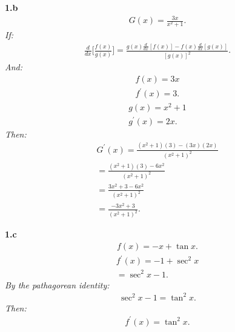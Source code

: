 \documentclass{report}
\begin{document}
    \pagebreak \bigbreak \noindent
    \begin{mdframed}
        \textbf{1.b}
        \begin{align*}
            G(x) = \frac{3x}{x^{2}+1}
        .\end{align*}
        \bigbreak \noindent 
        \bigbreak \noindent 
        \textit{If:}
        \begin{align*}
            \frac{d}{dx}\bigg[ \frac{f(x)}{g(x)}\bigg] = \frac{g(x) \frac{d}{dx}[f(x)] - f(x) \frac{d}{dx}[g(x)]}{[g(x)]^2}
        .\end{align*}
        \bigbreak \noindent 
        \textit{And:}
        \begin{align*}
            f(x) = 3x \\
            f^{\prime}(x) = 3
        .\end{align*}
        \begin{align*}
            g(x) = x^{2} + 1 \\
            g^{\prime}(x) = 2x
        .\end{align*}
        \bigbreak \noindent 
        \textit{Then:}
        \begin{align*}
            G^{\prime}(x) = \frac{(x^{2}+1)(3) - (3x)(2x)}{(x^{2}+1)^{2}} \\
            =\frac{(x^{2}+1)(3)-6x^{2}}{(x^{2}+1)^{2}} \\ 
            = \frac{3x^{2}+3-6x^{2}}{(x^{2}+1)^{2}} \\
            = \frac{-3x^{2}+3}{(x^{2}+1)^{2}}
        .\end{align*}
    \end{mdframed}

    \bigbreak \noindent 
    \begin{mdframed}
        \textbf{1.c}
        \begin{align*}
            f(x) = -x + \tan{x}
        .\end{align*}
        \begin{align*}
            f^{\prime}(x) = -1 + \sec^{2}{x} \\ 
            = \sec^{2}{x}  - 1
        .\end{align*}
        \bigbreak \noindent 
        \textit{By the pathagorean identity:}
        \begin{align*}
            \sec^{2}{x} - 1 = \tan^{2}{x}
        .\end{align*}
        \textit{Then:}
        \begin{align*}
            f^{\prime}(x) = \tan^{2}{x}
        .\end{align*}
    \end{mdframed}
\end{document}
